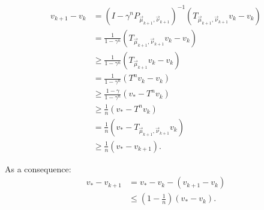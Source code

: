 \documentclass{article}
\begin{document}
\begin{align}
 v_{k+1} - v_k & = (I-\gamma^n P_{\vec\mu_{k+1},\vec\nu_{k+1}})^{-1} (T_{\vec\mu_{k+1},\vec\nu_{k+1}} v_k - v_k) \\
 & = \frac{1}{1-\gamma^n}  (T_{\vec\mu_{k+1},\vec\nu_{k+1}}v_k - v_k) \\
 & \ge \frac{1}{1-\gamma^n}  (T_{\vec\mu_{k+1}}v_k - v_k) \\
 & = \frac{1}{1-\gamma^n}  (T^n v_k - v_k) \\
 & \ge \frac{1-\gamma}{1-\gamma^n}  (v_* - T^n v_k) \\
 & \ge \frac{1}{n}  (v_* - T^n v_k) \\
 & = \frac{1}{n}  (v_* - T_{\vec\mu_{k+1},\vec\nu_{k+1}} v_k) \\
 & \ge \frac{1}{n}  (v_* - v_{k+1}).
\end{align}

As a consequence:
\begin{align}
  v_* - v_{k+1} & = v_* - v_k - (v_{k+1} - v_k) \\
  & \le \left(1 - \frac{1}{n} \right) (v_* - v_k).
\end{align}







\end{document}
